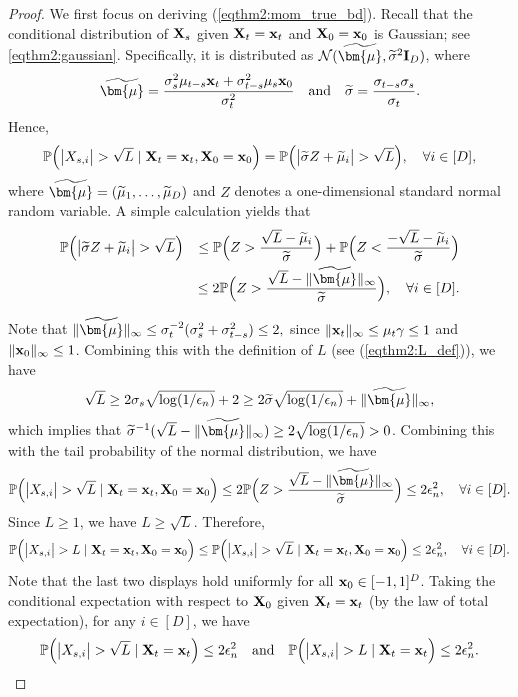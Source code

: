 \documentclass[11pt,a4paper,final]{article}
\numberwithin{equation}{section}
\theoremstyle{remark}
\def\cN{\mathcal N}
\newcommand{\bI}{{\bf I}}
\newcommand{\bx}{{\bf x}}
\newcommand{\bX}{{\bf X}}
\newcommand{\bbP}{{\mathbb P}}
\newcommand{\bmu}{\bm{\mu}}
\newcommand{\be}{\begin{equation}}
\newcommand{\ee}{\end{equation}}
\newcommand{\bean}{\setlength\arraycolsep{1pt}\begin{eqnarray*}}
\newcommand{\eean}{\end{eqnarray*}}
\begin{document}
\begin{proof}
We first focus on deriving (\ref{eqthm2:mom_true_bd}).
Recall that the conditional distribution of $\bX_{s}$ given $\bX_{t} = \bx_t$ and $\bX_{0} = \bx_{0}$ is Gaussian; see \eqref{eqthm2:gaussian}.
Specifically, it is distributed as $\cN ( \widetilde \bmu, \widetilde \sigma^2 \bI_{D})$, where
\bean
\widetilde \bmu = \frac{ \sigma_{s}^2 \mu_{t-s} \bx_{t} + \sigma_{t-s}^2 \mu_{s} \bx
_{0} }{\sigma_{t}^2} 
\quad \text{and} \quad 
\widetilde \sigma = \frac{ \sigma_{t-s} \sigma_{s} }{\sigma_{t}}.
\eean
Hence,
\bean
\bbP \Big(
\big\vert   X_{s,i}  \big\vert > \sqrt{L} \mid  \bX_{t} = \bx_{t}, \bX_{0} = \bx_{0}
\Big)
= \bbP \Big(
\big\vert  \widetilde \sigma Z + \widetilde \mu_{i}  \big\vert > \sqrt{L}  \Big), \quad \forall i \in [D],
\eean
where $\widetilde \bmu = (\widetilde \mu_1, \ldots, \widetilde \mu_{D})$ and $Z$ denotes a one-dimensional standard normal random variable.
A simple calculation yields that
\bean
\bbP \Big(
\big\vert  \widetilde \sigma Z + \widetilde \mu_{i}  \big\vert > \sqrt{L}  \Big)
&& \leq \bbP \Big( Z > \frac{ \sqrt{L}  - \widetilde \mu_i }{\widetilde \sigma} \Big)
+ \bbP \Big( Z < \frac{ - \sqrt{L}  - \widetilde \mu_i }{\widetilde \sigma} \Big)
\\
&& \leq 2 \bbP \Big( Z > \frac{ \sqrt{L}  - \| \widetilde \bmu \|_{\infty} }{\widetilde \sigma} \Big),
\quad \forall i \in [D].
\eean

Note that $\| \widetilde \bmu \|_{\infty} \leq \sigma_{t}^{-2} ( \sigma_{s}^2 + \sigma_{t-s}^2 ) \leq 2,$ since $\| \bx_{t} \|_{\infty} \leq \mu_{t}\gamma \leq 1$ and $\| \bx_0 \|_{\infty} \leq 1$.
Combining this with the definition of $L$ (see (\ref{eqthm2:L_def})), we have
\bean
\sqrt{L}
\geq 2 \sigma_{s} \sqrt{ \log (1/\epsilon_n) } + 2
\geq 2 \widetilde \sigma \sqrt{ \log (1/\epsilon_n) } + \| \widetilde \bmu \|_{\infty},
\eean
which implies that $\widetilde \sigma^{-1} (\sqrt{L}  - \| \widetilde \bmu \|_{\infty} ) \geq 2 \sqrt{ \log ( 1/\epsilon_n )} > 0$.
Combining this with the tail probability of the normal distribution, we have
\bean
\bbP \Big(
\big\vert   X_{s,i}  \big\vert > \sqrt{L}  \mid  \bX_{t} = \bx_{t}, \bX_{0} = \bx_{0}
\Big)
\leq
 2 \bbP \Big( Z > \frac{ \sqrt{L}  - \| \widetilde \bmu \|_{\infty} }{\widetilde \sigma} \Big)
\leq
2\epsilon_n^2, \quad \forall i \in [D].
\eean
Since $L \geq 1$, we have $L \geq \sqrt{L}$.
Therefore,
\bean
\bbP \Big(
\big\vert   X_{s,i}  \big\vert > L \mid  \bX_{t} = \bx_{t}, \bX_{0} = \bx_{0}
\Big)
\leq
\bbP \Big(
\big\vert   X_{s,i}  \big\vert > \sqrt{L} \mid  \bX_{t} = \bx_{t}, \bX_{0} = \bx_{0}
\Big)
\leq
2\epsilon_n^2, \quad \forall i \in [D].
\eean
Note that the last two displays hold uniformly for all $\bx_{0} \in [-1,1]^{D}$.
Taking the conditional expectation with respect to $\bX_0$ given $\bX_t=\bx_t$ (by the law of total expectation), for any $i \in [D]$, we have
\be
\bbP \Big(
\big\vert   X_{s,i}  \big\vert > \sqrt{L} \mid  \bX_{t} = \bx_{t}
\Big) \leq 2 \epsilon_n^2
\quad \text{and} \quad
\bbP \Big(
\big\vert   X_{s,i}  \big\vert > L \mid  \bX_{t} = \bx_{t}
\Big) \leq 2 \epsilon_n^2.
\label{eqthm2:tail_true_bd}
\ee


\end{proof}
\end{document}
